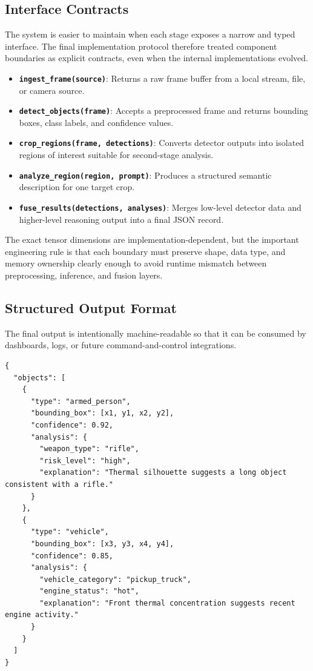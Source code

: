 \subsection{Interface Contracts}

The system is easier to maintain when each stage exposes a narrow and typed interface. The
final implementation protocol therefore treated component boundaries as explicit contracts,
even when the internal implementations evolved.

\begin{itemize}[nosep]
  \item \textbf{\texttt{ingest\_frame(source)}}: Returns a raw frame buffer from a local
    stream, file, or camera source.
  \item \textbf{\texttt{detect\_objects(frame)}}: Accepts a preprocessed frame and returns
    bounding boxes, class labels, and confidence values.
  \item \textbf{\texttt{crop\_regions(frame, detections)}}: Converts detector outputs into
    isolated regions of interest suitable for second-stage analysis.
  \item \textbf{\texttt{analyze\_region(region, prompt)}}: Produces a structured semantic
    description for one target crop.
  \item \textbf{\texttt{fuse\_results(detections, analyses)}}: Merges low-level detector
    data and higher-level reasoning output into a final JSON record.
\end{itemize}

The exact tensor dimensions are implementation-dependent, but the important engineering
rule is that each boundary must preserve shape, data type, and memory ownership clearly
enough to avoid runtime mismatch between preprocessing, inference, and fusion layers.

\subsection{Structured Output Format}

The final output is intentionally machine-readable so that it can be consumed by dashboards,
logs, or future command-and-control integrations.

\begin{lstlisting}[language={},caption={Illustrative structured output produced by the fusion layer}]
{
  "objects": [
    {
      "type": "armed_person",
      "bounding_box": [x1, y1, x2, y2],
      "confidence": 0.92,
      "analysis": {
        "weapon_type": "rifle",
        "risk_level": "high",
        "explanation": "Thermal silhouette suggests a long object consistent with a rifle."
      }
    },
    {
      "type": "vehicle",
      "bounding_box": [x3, y3, x4, y4],
      "confidence": 0.85,
      "analysis": {
        "vehicle_category": "pickup_truck",
        "engine_status": "hot",
        "explanation": "Front thermal concentration suggests recent engine activity."
      }
    }
  ]
}
\end{lstlisting}

